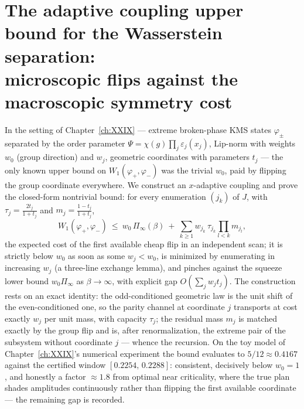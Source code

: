 \chapter[The adaptive coupling upper bound]{The adaptive coupling upper bound for the Wasserstein separation:\\ microscopic flips against the macroscopic symmetry cost}\label{ch:XXXIII}
\renewcommand{\Prob}{\mathrm{Prob}}
\begin{summary}
In the setting of Chapter~\ref{ch:XXIX} --- extreme broken-phase KMS states $\varphi_\pm$ separated
by the order parameter $\Psi=\chi(g)\prod_j\varepsilon_j(x_j)$, Lip-norm with weights
$w_0$ (group direction) and $w_j$, geometric coordinates with parameters $t_j$ --- the
only known upper bound on $W_1(\varphi_+,\varphi_-)$ was the trivial $w_0$, paid by
flipping the group coordinate everywhere. We construct an $x$-adaptive coupling and prove
the closed-form nontrivial bound: for every enumeration $(j_k)$ of $J$, with
$\tau_j=\tfrac{2t_j}{1+t_j}$ and $m_j=\tfrac{1-t_j}{1+t_j}$,
\[
W_1(\varphi_+,\varphi_-)\ \le\
w_0\,\Pi_\infty(\beta)\ +\ \sum_{k\ge1}w_{j_k}\,\tau_{j_k}\prod_{l<k}m_{j_l},
\]
the expected cost of the first available cheap flip in an independent scan; it is
strictly below $w_0$ as soon as some $w_j<w_0$, is minimized by enumerating in increasing
$w_j$ (a three-line exchange lemma), and pinches against the squeeze lower bound
$w_0\Pi_\infty$ as $\beta\to\infty$, with explicit gap
$O(\sum_jw_jt_j)$. The construction rests on an exact identity: the odd-conditioned
geometric law is the unit shift of the even-conditioned one, so the parity channel at
coordinate $j$ transports at cost exactly $w_j$ per unit mass, with capacity $\tau_j$;
the residual mass $m_j$ is matched exactly by the group flip and is, after
renormalization, the extreme pair of the subsystem without coordinate $j$ --- whence the
recursion. On the toy model of Chapter~\ref{ch:XXIX}'s numerical experiment the bound evaluates to
$5/12\approx0.4167$ against the certified window $[0.2254,\,0.2288]$: consistent,
decisively below $w_0=1$, and honestly a factor $\approx1.8$ from optimal near
criticality, where the true plan shades amplitudes continuously rather than flipping the
first available coordinate --- the remaining gap is recorded.
\end{summary}


